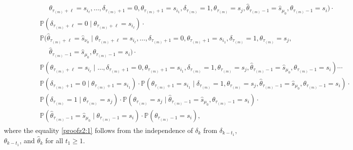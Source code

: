 \documentclass[journal,twoside,web]{ieeecolor}
\begin{document}
\begin{figure*}[ht]
\begin{align}
\begin{aligned}
& \qquad\qquad\quad\! \theta_{\tau_{(m)}+\ell}=s_{i_{\ell}},\dots,
\delta_{\tau_{(m)}+1}=0,\theta_{\tau_{(m)}+1}=s_{i_{1}},\delta_{\tau_{(m)}}=1,\theta_{\tau_{(m)}}=s_j,\hat{\theta}_{\tau_{(m)}-1} = \hat{s}_{\mu_0}, \theta_{\tau_{(m)}-1}=s_i) \cdot \\
& \qquad\quad~~~\! 
\mathbb{P}(\delta_{\tau_{(m)}+\ell}=0 \mid \theta_{\tau_{(m)}+\ell}=s_{i_{\ell}}) \cdot \\
& \qquad\quad~~~\! 
\mathbb{P}(\hat{\theta}_{\tau_{(m)}+\ell} = \hat{s}_{\nu_{0}} \mid \theta_{\tau_{(m)}+\ell}=s_{i_{\ell}},\dots,
\delta_{\tau_{(m)}+1}=0,\theta_{\tau_{(m)}+1}=s_{i_{1}},\delta_{\tau_{(m)}}=1,\theta_{\tau_{(m)}}=s_j,\\
& \qquad\qquad\quad\! \hat{\theta}_{\tau_{(m)}-1} = \hat{s}_{\mu_0}, \theta_{\tau_{(m)}-1}=s_i) \cdot \\
& \qquad\quad~~~\! 
\mathbb{P}(\theta_{\tau_{(m)}+\ell}=s_{i_{\ell}} \mid \dots, \delta_{\tau_{(m)}+1}=0,\theta_{\tau_{(m)}+1}=s_{i_{1}},\delta_{\tau_{(m)}}=1,\theta_{\tau_{(m)}}=s_j,\hat{\theta}_{\tau_{(m)}-1} = \hat{s}_{\mu_0}, \theta_{\tau_{(m)}-1}=s_i) \cdots \\
& \qquad\quad~~~\! 
\mathbb{P}(\delta_{\tau_{(m)}+1}=0 \mid \theta_{\tau_{(m)}+1}=s_{i_{1}}) \cdot 
\mathbb{P}(\theta_{\tau_{(m)}+1}=s_{i_{1}} \mid \delta_{\tau_{(m)}}=1,\theta_{\tau_{(m)}}=s_j,\hat{\theta}_{\tau_{(m)}-1} = \hat{s}_{\mu_0}, \theta_{\tau_{(m)}-1}=s_i) \cdot \\
& \qquad\quad~~~\! 
\mathbb{P}(\delta_{\tau_{(m)}}=1 \mid \theta_{\tau_{(m)}}=s_j) \cdot
\mathbb{P}(\theta_{\tau_{(m)}}=s_j \mid \hat{\theta}_{\tau_{(m)}-1} = \hat{s}_{\mu_0}, \theta_{\tau_{(m)}-1}=s_i) \cdot \\
& \qquad\quad~~~\! \mathbb{P}(\hat{\theta}_{\tau_{(m)}-1} = \hat{s}_{\mu_0} \mid \theta_{\tau_{(m)}-1}=s_i) \cdot
\mathbb{P}(\theta_{\tau_{(m)}-1}=s_i),
\end{aligned}
\end{align}
 where the equality \eqref{proofz2:1} follows from the independence of $\delta_{k}$ from $\delta_{k-t_{1}}$, $\theta_{k-t_{1}}$, and $\hat{\theta}_{k}$ for all $t_{1}\geq 1$.
\end{figure*}
\end{document}
